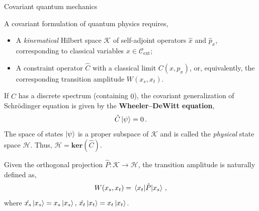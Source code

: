 \documentclass{beamer}
\newcommand\boldtext[1]{\textcolor{bolds}{\textbf{#1}}}
\newcommand\italictext[1]{\textcolor{italics}{\textit{#1}}}
\begin{document}
\begin{frame}{Covariant quantum mechanics}
    \begin{list}{\maltese}{\leftmargin=1em \itemindent=0em}
        \item<1-> A covariant formulation of quantum physics requires,
        \begin{itemize}
            \item<1-> A \italictext{kinematical} Hilbert space $\mathcal{K}$ of self-adjoint operators $\hat{x}$ and $\hat{p}_x$, corresponding to classical variables $x\in\mathcal{C}_{\text{ext}}$;
            \item<2-> A constraint operator $\hat{C}$ with a classical limit $C(x,p_x)$, or, equivalently, the corresponding transition amplitude $W(x_s,x_t)$.
        \end{itemize}
        \item<3-> If $\hat{C}$ has a discrete spectrum (containing $0$), the covariant generalization of Schr\"{o}dinger equation is given by the \boldtext{Wheeler–DeWitt equation},
        \begin{equation}
            \hat{C}\ket{\psi}=0\,.
        \end{equation}
        The space of states $\ket{\psi}$ is a proper subspace of $\mathcal{K}$ and is called the \italictext{physical} state space $\mathcal{H}$. Thus, $\mathcal{H}=\mathbf{ker}(\hat{C})$.
        \item<4-> Given the orthogonal projection $\hat{P}:\mathcal{K}\to\mathcal{H}$, the transition amplitude is naturally defined as,
        \begin{equation}
            W(x_s,x_t)=\mel{x_t}{\hat{P}}{x_s}\,,
        \end{equation}
        where $\hat{x_s}\ket{x_s}=x_s\ket{x_s},\,\hat{x_t}\ket{x_t}=x_t\ket{x_t}$.
    \end{list}
\end{frame}
\end{document}
